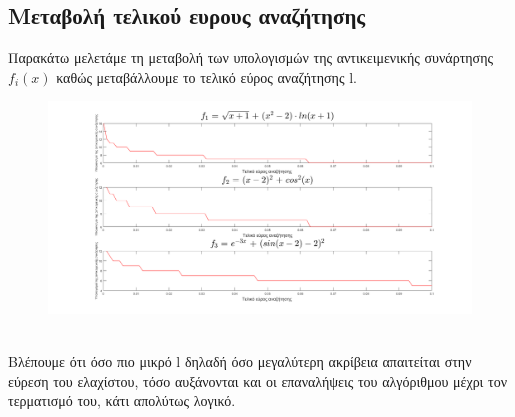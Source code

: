 \documentclass{article}
\begin{document}
\newpage

\subsection*{Μεταβολή τελικού ευρους αναζήτησης}
Παρακάτω μελετάμε τη μεταβολή των υπολογισμών της αντικειμενικής συνάρτησης $f_i(x)$
καθώς μεταβάλλουμε το τελικό εύρος αναζήτησης l.
\begin{figure}[h!]	
     \centering
     \advance\leftskip-4.75cm 
  \includegraphics[width=220mm,scale=2]{thema4a.png}
\end{figure} \\
Βλέπουμε ότι όσο πιο μικρό l δηλαδή όσο μεγαλύτερη ακρίβεια απαιτείται στην εύρεση του
ελαχίστου, τόσο αυξάνονται και οι επαναλήψεις του αλγόριθμου μέχρι τον τερματισμό του, κάτι
απολύτως λογικό.
 \clearpage
\end{document}
